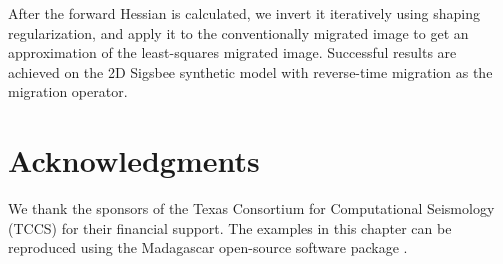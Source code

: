     After the forward Hessian is calculated, we invert it iteratively using shaping regularization, and apply it to the conventionally migrated image to get an approximation of the least-squares migrated image.
    Successful results are achieved on the 2D Sigsbee synthetic model with reverse-time migration as the migration operator.


\section{Acknowledgments}
    We thank the sponsors of the Texas Consortium for Computational Seismology (TCCS) for their financial support.
    The examples in this chapter can be reproduced using the Madagascar open-source software package \cite[]{madagascar}.
